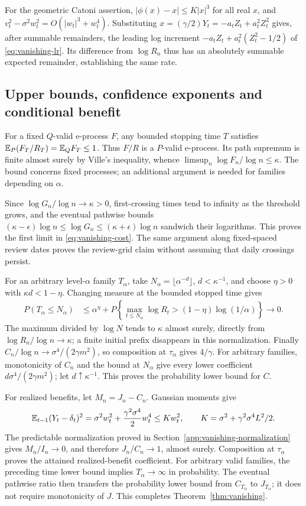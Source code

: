 For the geometric Catoni assertion, $|\phi(x)-x|\le K|x|^3$ for all real
$x$, and $v_t^2-\sigma^2w_t^2=O(|w_t|^3+w_t^4)$. Substituting
$x=(\gamma/2)Y_t=-a_tZ_t+a_t^2Z_t^2$ gives, after summable remainders,
the leading log increment $-a_tZ_t+a_t^2(Z_t^2-1/2)$ of
\eqref{eq:vanishing-lr}. Its difference from $\log R_n$ thus has an
absolutely summable expected remainder, establishing the same rate.

\subsection{Upper bounds, confidence exponents and conditional benefit}
For a fixed $Q$-valid e-process $F$, any bounded stopping time $T$ satisfies
$\mathbb E_P(F_T/R_T)=\mathbb E_Q F_T\le1$. Thus $F/R$ is a $P$-valid e-process.
Its path supremum is finite almost surely by Ville's inequality, whence
$\limsup_n\log F_n/\log n\le\kappa$. The bound concerns fixed processes;
an additional argument is needed for families depending on $\alpha$.

Since $\log G_n/\log n\to\kappa>0$, first-crossing times tend to infinity
as the threshold grows, and the eventual pathwise bounds
$(\kappa-\epsilon)\log n\le\log G_n\le(\kappa+\epsilon)\log n$
sandwich their logarithms. This proves the first limit in
\eqref{eq:vanishing-cost}. The same argument along fixed-spaced review dates
proves the review-grid claim without assuming that daily crossings persist.

For an arbitrary level-$\alpha$ family $T_\alpha$, take
$N_\alpha=\lfloor\alpha^{-d}\rfloor$, $d<\kappa^{-1}$, and choose
$\eta>0$ with $\kappa d<1-\eta$. Changing measure at the bounded stopped
time gives
\begin{align*}
 P(T_\alpha\le N_\alpha)
 &\le \alpha^{\eta}
 +P\!\left\{\max_{t\le N_\alpha}\log R_t
                      >(1-\eta)\log(1/\alpha)\right\}\longrightarrow0.
\end{align*}
The maximum divided by $\log N$ tends to $\kappa$ almost surely, directly
from $\log R_n/\log n\to\kappa$; a finite initial prefix disappears in this
normalization. Finally $C_n/\log n\to\sigma^4/(2\gamma m^2)$, so composition
at $\tau_\alpha$ gives $4/\gamma$. For arbitrary families, monotonicity of
$C_n$ and the bound at $N_\alpha$ give every lower coefficient
$d\sigma^4/(2\gamma m^2)$; let $d\uparrow\kappa^{-1}$. This proves the
probability lower bound for $C$.

For realized benefits, let $M_n=J_n-C_n$. Gaussian moments give
\[
 \mathbb E_{t-1}(Y_t-\delta_t)^2
 =\sigma^2w_t^2+\frac{\gamma^2\sigma^4}{2}w_t^4\le K w_t^2,
 \qquad K=\sigma^2+\gamma^2\sigma^4L^2/2.
\]
The predictable normalization proved in Section~\ref{app:vanishing-normalization}
gives $M_n/I_n\to0$, and therefore $J_n/C_n\to1$, almost surely.
Composition at $\tau_\alpha$ proves the attained realized-benefit coefficient.
For arbitrary valid families, the preceding time lower bound implies
$T_\alpha\to\infty$ in probability. The eventual pathwise ratio then transfers
the probability lower bound from $C_{T_\alpha}$ to $J_{T_\alpha}$; it does
not require monotonicity of $J$. This completes Theorem~\ref{thm:vanishing}.

